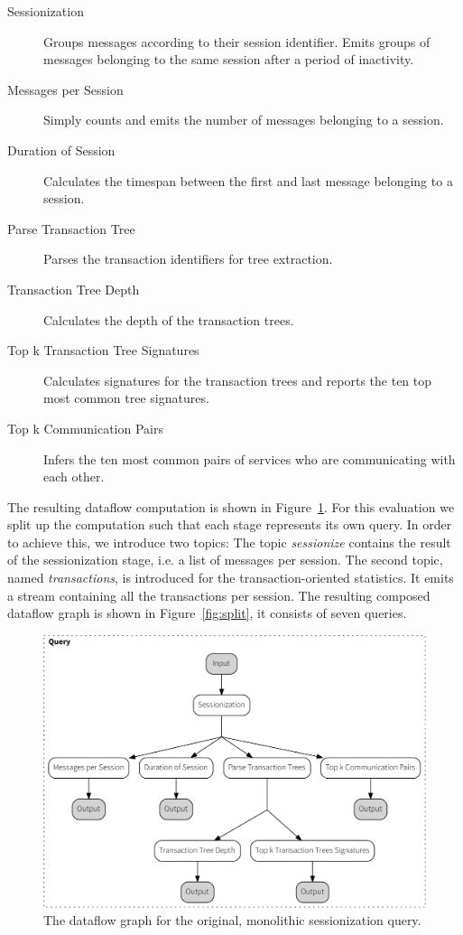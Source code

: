 \begin{description}
\item [Sessionization] Groups messages according to their session identifier.
Emits groups of messages belonging to the same session after a period of inactivity.
\item [Messages per Session] Simply counts and emits the number of messages belonging to a session.
\item [Duration of Session] Calculates the timespan between the first and last message belonging
to a session.
\item [Parse Transaction Tree] Parses the transaction identifiers for tree extraction.
\item [Transaction Tree Depth] Calculates the depth of the transaction trees.
\item [Top k Transaction Tree Signatures] Calculates signatures for the transaction trees and
reports the ten top most common tree signatures.
\item [Top k Communication Pairs] Infers the ten most common pairs of services who are
communicating with each other.
\end{description}


The resulting dataflow computation is shown in Figure~\ref{fig:monolith}. For
this evaluation we split up the computation such that each stage represents
its own query. In order to achieve this, we introduce two topics: The topic
\emph{sessionize} contains the result of the sessionization stage, i.e. 
a list of messages per session. The second topic, named \emph{transactions},
is introduced for the transaction-oriented statistics. It emits a stream
containing all the transactions per session. The resulting composed dataflow
graph is shown in Figure~\ref{fig:split}, it consists of seven queries.

\begin{figure}[p]
  \centering
    \includegraphics[width=1\textwidth]{figures/sessionize_dataflow-crop}
  \caption[Dataflow graph for monolithic sessionization]{The dataflow graph
  for the original, monolithic sessionization query.}
  \label{fig:monolith}
\end{figure}

